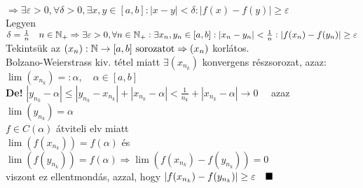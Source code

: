 \documentclass[a4paper,11pt]{article}
\begin{document}
$\Rightarrow\exists\varepsilon>0,\forall\delta>0,\exists x,y\in[a,b]:|x-y|<\delta:
|f(x)-f(y)|\geq\varepsilon$\\[0.1cm] Legyen $\delta=\frac{1}{n}\quad n\in\mathbb{N}_+
\Rightarrow\exists\varepsilon>0,\forall n\in\mathbb{N}_+:\exists x_n,y_n\in[a,b]:|x_n-y_n|
<\frac{1}{n}:|f(x_n)-f(y_n)|\geq\varepsilon$ \\[0.1cm] Tekintsük az $(x_n): 
\mathbb{N}\to[a,b]\text{ sorozatot}\Rightarrow (x_n)$ korlátos.\\[0.1cm]
Bolzano-Weierstrass kiv. tétel miatt $\exists(x_{n_k})$ konvergens részsorozat,
azaz:\\[0.1cm] $\lim(x_{n_k})=:\alpha,\quad\alpha\in[a,b]$\\[0.1cm]\textbf{De!}
$|y_{n_k}-\alpha|\leq|y_{n_k}-x_{n_k}|+|x_{n_k}-\alpha|<\frac{1}{n_k}
+|x_{n_k}-\alpha|\to0\quad$ azaz $\lim(y_{n_k})=\alpha$\\[0.1cm] $f\in C(\alpha)$
átviteli elv miatt\\[0.1cm]$\lim(f(x_{n_k}))=f(\alpha)$ és $\lim(f(y_{n_k}))=
f(\alpha)\Rightarrow\lim(f(x_{n_k})-f(y_{n_k}))=0$\\[0.1cm] viszont ez
ellentmondás, azzal, hogy $|f(x_{n_k})-f(y_{n_k})|\geq\varepsilon\quad\blacksquare$
\end{document}
